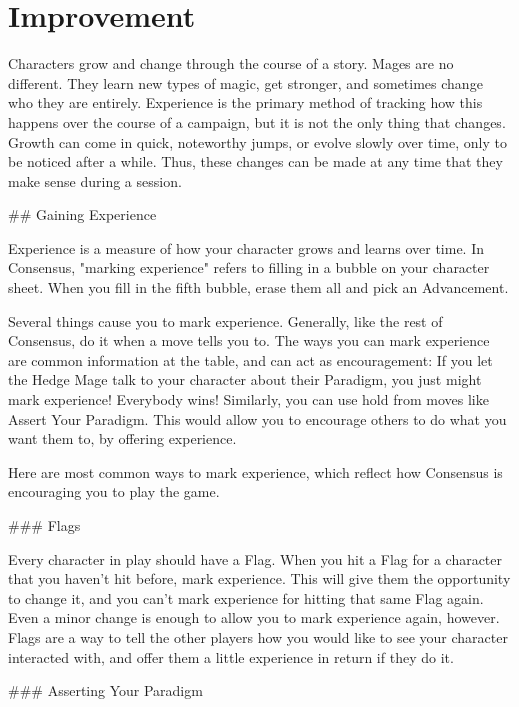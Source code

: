 \documentclass[
  oneside,
  statementpaper,
  9pt]{memoir}
\begin{document}
\newpage

\hypertarget{improvement}{%
\chapter{Improvement}\label{improvement}}

\begin{Player}

Characters grow and change through the course of a story. Mages are no different. They learn new types of magic, get stronger, and sometimes change who they are entirely. Experience is the primary method of tracking how this happens over the course of a campaign, but it is not the only thing that changes. Growth can come in quick, noteworthy jumps, or evolve slowly over time, only to be noticed after a while. Thus, these changes can be made at any time that they make sense during a session.

## Gaining Experience

Experience is a measure of how your character grows and learns over time. In Consensus, "marking experience" refers to filling in a bubble on your character sheet. When you fill in the fifth bubble, erase them all and pick an Advancement.

Several things cause you to mark experience. Generally, like the rest of Consensus, do it when a move tells you to. The ways you can mark experience are common information at the table, and can act as encouragement: If you let the Hedge Mage talk to your character about their Paradigm, you just might mark experience! Everybody wins! Similarly, you can use hold from moves like Assert Your Paradigm. This would allow you to encourage others to do what you want them to, by offering experience.

Here are most common ways to mark experience, which reflect how Consensus is encouraging you to play the game.

### Flags

Every character in play should have a Flag. When you hit a Flag for a character that you haven’t hit before, mark experience. This will give them the opportunity to change it, and you can’t mark experience for hitting that same Flag again. Even a minor change is enough to allow you to mark experience again, however. Flags are a way to tell the other players how you would like to see your character interacted with, and offer them a little experience in return if they do it.

### Asserting Your Paradigm


\end{Player}
\end{document}
